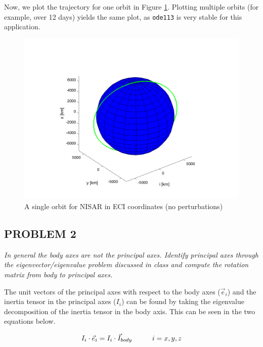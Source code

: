 

Now, we plot the trajectory for one orbit in Figure \ref{fig:simple_propagator}. Plotting multiple orbits (for example, over 12 days) yields the same plot, as \texttt{ode113} is very stable for this application.

\begin{figure}[H]
\centering
\includegraphics[scale=0.7]{Images/ps2_problem1.png}
\caption{A single orbit for NISAR in ECI coordinates (no perturbations)}
\label{fig:simple_propagator}
\end{figure}


\subsection{PROBLEM 2}
\textit{In general the body axes are not the principal axes. Identify principal axes through the eigenvector/eigenvalue problem discussed in class and compute the rotation matrix from body to principal axes.}

The unit vectors of the principal axes with respect to the body axes ($\Vec{e}_i$) and the inertia tensor in the principal axes ($I_i$) can be found by taking the eigenvalue decomposition of the inertia tensor in the body axis. This can be seen in the two equations below.

\begin{equation*}
    I_i \cdot \Vec{e}_i = I_i \cdot \Vec{I}_{body} \\ \hspace{1cm} i = x, y, z
\end{equation*}

